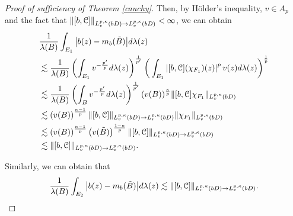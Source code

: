 \documentclass[11pt,a4paper]{amsart}
\numberwithin{equation}{section}
\begin{document}
{\begin{proof}[Proof of sufficiency of Theorem \ref{cauchy}]
%
%
%
%
\color{black}
Then, by H\"older's inequality, $v\in A_p$ and the fact that $\left\|[b,\EuScript C]\right\|_{L_v^{p,\kappa}(bD)\to L_v^{p,\kappa}(bD)} <\infty$, we can obtain
\begin{align*}
&{1\over \lambda(B)}\int_{E_{1}}\big|b(z)-m_b(\tilde B)\big|d\lambda(z)\\
&\lesssim
{1\over \lambda(B)}\left(\int_{E_1}v^{-{p'\over p}}d\lambda(z)\right)^{1\over p'}\bigg(\int_{E_{1}}\left|[b, \EuScript C](\chi_{F_1})(z)\right|^pv(z)d\lambda(z)\bigg)^{1\over p}\\
&\lesssim
 {1\over \lambda(B)}\left(\int_{B}v^{-{p'\over p}}d\lambda(z)\right)^{1\over p'}(v(B))^{\kappa\over p}\|[b, \EuScript C]\chi_{F_1}\|_{L_v^{p,\kappa}(bD)}\\
 &\lesssim
 \left(v(B)\right)^{{\kappa-1\over p}}
\|[b, \EuScript C]\|_{L_v^{p,\kappa}(bD)\to L_v^{p,\kappa}(bD)}\|\chi_{F_1}\|_{L_v^{p,\kappa}(bD)}\\
 &\lesssim
 \left(v(B)\right)^{{\kappa-1\over p}} \left(v(\tilde B)\right)^{{1-\kappa\over p}}
\|[b, \EuScript C]\|_{L_v^{p,\kappa}(bD)\to L_v^{p,\kappa}(bD)}\\
&\lesssim
  \|[b, \EuScript C]\|_{L_v^{p,\kappa}(bD)\to L_v^{p,\kappa}(bD)}.
\end{align*}


Similarly, we can obtain that
\begin{align*}
{1\over \lambda(B)}\int_{E_{2}}\big|b(z)-m_b(\tilde B)\big|d\lambda(z)
\lesssim
 \|[b, \EuScript C]\|_{L_v^{p,\kappa}(bD)\to L_v^{p,\kappa}(bD)}.
\end{align*}



\end{proof}}
\end{document}
